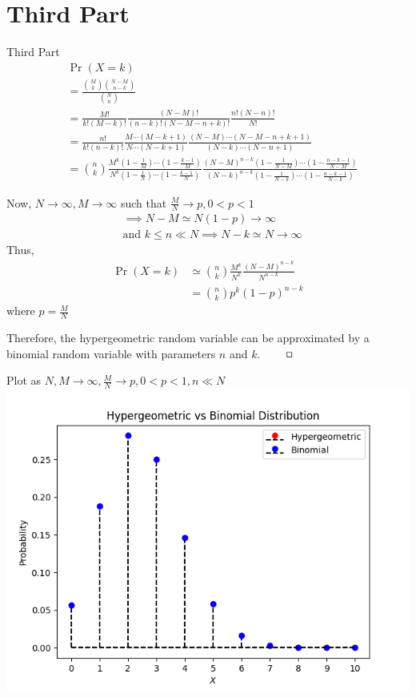 \documentclass{beamer}
\providecommand{\pr}[1]{\ensuremath{\Pr\left(#1\right)}}
\providecommand{\brak}[1]{\ensuremath{\left(#1\right)}}
\begin{document}
	\section{Third Part}
	\begin{frame}{Third Part}
	\begin{align}
		&\pr{X=k} \\
		&= \frac{\binom{M}{k} \binom{N-M}{n-k}}{\binom{N}{n}} \\
		&= \frac{M!}{k!(M-k)!} \frac{(N-M)!}{(n-k)!(N-M-n+k)!} \frac{n!(N-n)!}{N!} \\
		&= \frac{n!}{k!(n-k)!} \frac{M\cdots(M-k+1)}{N\cdots(N-k+1)} \frac{(N-M)\cdots(N-M-n+k+1)}{(N-k)\cdots(N-n+1)} \\
		&= \binom{n}{k} \frac{M^k \brak{1-\frac1M} \cdots \brak{1-\frac{k-1}{M}}}{N^k \brak{1-\frac1N} \cdots \brak{1-\frac{k-1}{N}}} \frac{(N-M)^{n-k} \brak{1-\frac{1}{N-M}} \cdots \brak{1-\frac{n-k-1}{N-M}}}{(N-k)^{n-k} \brak{1-\frac{1}{N-k}} \cdots \brak{1-\frac{n-k-1}{N-k}}}
	\end{align}
	\end{frame}
	
	\begin{frame}
	Now, $N \to \infty, M \to \infty$ such that $\frac{M}{N} \to p, 0<p<1$
	\begin{align}
		&\implies N-M \simeq N(1-p) \to \infty \\
		&\text{and } k \le n \ll N \implies N-k \simeq N \to \infty
	\end{align}
	Thus,
	\begin{align}
		\pr{X=k} &\simeq \binom{n}{k} \frac{M^k}{N^k} \frac{(N-M)^{n-k}}{N^{n-k}} \\
		&= \binom{n}{k} p^k (1-p)^{n-k}
	\end{align}
	where $p = \frac{M}{N}$
	
	Therefore, the hypergeometric random variable can be approximated by a binomial random variable with parameters $n$ and $k$. $\qed$
	\end{frame}
	
	\begin{frame}{Plot as $N, M \to \infty, \frac{M}{N} \to p, 0 < p < 1, n \ll N$}
		\centering
		\includegraphics[height=0.8\paperheight]{figs/fig-2.png}
	\end{frame}
	
\end{document}

